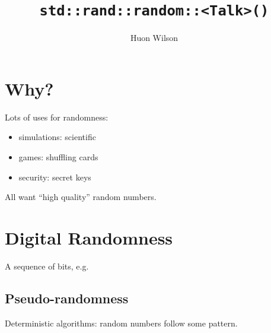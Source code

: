 \documentclass[14pt]{beamer}
\author{Huon Wilson}
\title{\texttt{std::rand::random::<Talk>()}}
\begin{document}
\begin{frame}
  \maketitle
\end{frame}

\section{Why?}
\begin{frame}
  Lots of uses for randomness:
  \begin{itemize}
  \item simulations: scientific
  \item games: shuffling cards
  \item security: secret keys
  \end{itemize}

  All want ``high quality'' random numbers.
\end{frame}

\section{Digital Randomness}
\begin{frame}
A sequence of bits, e.g.


\end{frame}

\subsection{Pseudo-randomness}
\begin{frame}
  Deterministic algorithms: random numbers follow some pattern.

\end{frame}
\end{document}
